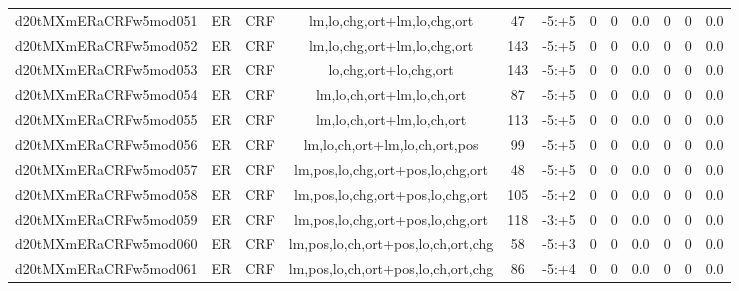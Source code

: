 \documentclass[a4paper]{article}
\begin{document}
\begin{landscape}
\begin{center}
\begin{tabular}{ |c|c|c|c|c|c|c|c|c|c|c|c|}
 
 	
 	\small{ d20tMXmERaCRFw5mod051 } & ER & CRF & lm,lo,chg,ort+lm,lo,chg,ort  &  47 &  -5:+5  &  0 & 0 & 0.0  &  0 & 0 & 0.0 \\
 	

 
 	
 	\small{ d20tMXmERaCRFw5mod052 } & ER & CRF & lm,lo,chg,ort+lm,lo,chg,ort  &  143 &  -5:+5  &  0 & 0 & 0.0  &  0 & 0 & 0.0 \\
 	

 
 	
 	\small{ d20tMXmERaCRFw5mod053 } & ER & CRF & lo,chg,ort+lo,chg,ort  &  143 &  -5:+5  &  0 & 0 & 0.0  &  0 & 0 & 0.0 \\
 	

 
 	
 	\small{ d20tMXmERaCRFw5mod054 } & ER & CRF & lm,lo,ch,ort+lm,lo,ch,ort  &  87 &  -5:+5  &  0 & 0 & 0.0  &  0 & 0 & 0.0 \\
 	

 
 	
 	\small{ d20tMXmERaCRFw5mod055 } & ER & CRF & lm,lo,ch,ort+lm,lo,ch,ort  &  113 &  -5:+5  &  0 & 0 & 0.0  &  0 & 0 & 0.0 \\
 	

 
 	
 	\small{ d20tMXmERaCRFw5mod056 } & ER & CRF & lm,lo,ch,ort+lm,lo,ch,ort,pos  &  99 &  -5:+5  &  0 & 0 & 0.0  &  0 & 0 & 0.0 \\
 	

 
 	
 	\small{ d20tMXmERaCRFw5mod057 } & ER & CRF & lm,pos,lo,chg,ort+pos,lo,chg,ort  &  48 &  -5:+5  &  0 & 0 & 0.0  &  0 & 0 & 0.0 \\
 	

 
 	
 	\small{ d20tMXmERaCRFw5mod058 } & ER & CRF & lm,pos,lo,chg,ort+pos,lo,chg,ort  &  105 &  -5:+2  &  0 & 0 & 0.0  &  0 & 0 & 0.0 \\
 	

 
 	
 	\small{ d20tMXmERaCRFw5mod059 } & ER & CRF & lm,pos,lo,chg,ort+pos,lo,chg,ort  &  118 &  -3:+5  &  0 & 0 & 0.0  &  0 & 0 & 0.0 \\
 	

 
 	
 	\small{ d20tMXmERaCRFw5mod060 } & ER & CRF & lm,pos,lo,ch,ort+pos,lo,ch,ort,chg  &  58 &  -5:+3  &  0 & 0 & 0.0  &  0 & 0 & 0.0 \\
 	

 
 	
 	\small{ d20tMXmERaCRFw5mod061 } & ER & CRF & lm,pos,lo,ch,ort+pos,lo,ch,ort,chg  &  86 &  -5:+4  &  0 & 0 & 0.0  &  0 & 0 & 0.0 \\
 	


\end{tabular}
\end{center}
\end{landscape}
\end{document}
